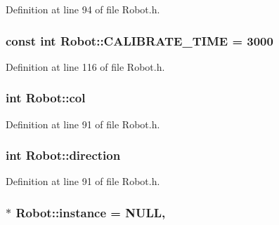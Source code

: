 Definition at line 94 of file Robot.\-h.

\hypertarget{classRobot_ac40abfa06749a68604af90c00e2a3fee}{
\subsubsection[{C\-A\-L\-I\-B\-R\-A\-T\-E\-\_\-\-T\-I\-M\-E}]{\setlength{\rightskip}{0pt plus 5cm}const int Robot\-::\-C\-A\-L\-I\-B\-R\-A\-T\-E\-\_\-\-T\-I\-M\-E = 3000\hspace{0.3cm}{\ttfamily [static]}}}\label{classRobot_ac40abfa06749a68604af90c00e2a3fee}


Definition at line 116 of file Robot.\-h.

\hypertarget{classRobot_a2e08d53491bb82defe2e28ee9ce1d096}{
\subsubsection[{col}]{\setlength{\rightskip}{0pt plus 5cm}int Robot\-::col}}\label{classRobot_a2e08d53491bb82defe2e28ee9ce1d096}


Definition at line 91 of file Robot.\-h.

\hypertarget{classRobot_ac25b4dfc2e9e5aa86ec5684d075d32b8}{
\subsubsection[{direction}]{\setlength{\rightskip}{0pt plus 5cm}int Robot\-::direction}}\label{classRobot_ac25b4dfc2e9e5aa86ec5684d075d32b8}


Definition at line 91 of file Robot.\-h.

\hypertarget{classRobot_aad5c5d6db601aac62393d47ec9385fa3}{
\subsubsection[{instance}]{ $\ast$ Robot\-::instance = N\-U\-L\-L\hspace{0.3cm}{\ttfamily [static]}, {\ttfamily [private]}}}\label{classRobot_aad5c5d6db601aac62393d47ec9385fa3}


